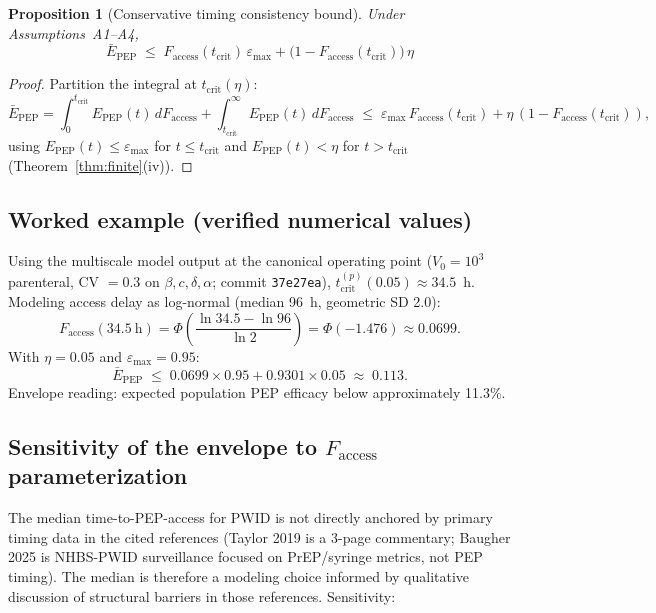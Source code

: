 \documentclass[11pt]{article}
\newtheorem{proposition}{Proposition}[section]
\theoremstyle{definition}
\theoremstyle{remark}
\newcommand{\Epep}{E_{\text{PEP}}}
\newcommand{\Ebarpep}{\bar{E}_{\text{PEP}}}
\newcommand{\Faccess}{F_{\text{access}}}
\newcommand{\tcrit}{t_{\text{crit}}}
\newcommand{\emax}{\varepsilon_{\max}}
\begin{document}
\begin{proposition}[Conservative timing consistency bound]\label{prop:bound}
Under Assumptions~A1--A4,
\begin{equation}
\Ebarpep \;\leq\; \Faccess(\tcrit)\,\emax + \big(1 - \Faccess(\tcrit)\big)\,\eta
\label{eq:bound_si}
\end{equation}
\end{proposition}

\begin{proof}
Partition the integral at $\tcrit(\eta)$:
\[
\Ebarpep = \int_{0}^{\tcrit} \Epep(t)\,d\Faccess + \int_{\tcrit}^{\infty} \Epep(t)\,d\Faccess
\;\leq\; \emax\,\Faccess(\tcrit) + \eta\,(1 - \Faccess(\tcrit)),
\]
using $\Epep(t) \leq \emax$ for $t \leq \tcrit$ and $\Epep(t) < \eta$ for $t > \tcrit$ (Theorem~\ref{thm:finite}(iv)).
\end{proof}

\subsection{Worked example (verified numerical values)}

Using the multiscale model output at the canonical operating point ($V_{0} = 10^{3}$ parenteral, CV $= 0.3$ on $\beta, c, \delta, \alpha$; commit \texttt{37e27ea}), $\tcrit^{(p)}(0.05) \approx 34.5$~h. Modeling access delay as log-normal (median 96~h, geometric SD 2.0):
\[
\Faccess(34.5~\text{h}) = \Phi\!\left(\frac{\ln 34.5 - \ln 96}{\ln 2}\right) = \Phi(-1.476) \approx 0.0699.
\]
With $\eta = 0.05$ and $\emax = 0.95$:
\[
\Ebarpep \;\leq\; 0.0699 \times 0.95 + 0.9301 \times 0.05 \;\approx\; 0.113.
\]
Envelope reading: expected population PEP efficacy below approximately 11.3\%.

\subsection{Sensitivity of the envelope to \texorpdfstring{$\Faccess$}{Faccess} parameterization}

The median time-to-PEP-access for PWID is not directly anchored by primary timing data in the cited references (Taylor 2019\cite{taylor2019_si} is a 3-page commentary; Baugher 2025\cite{baugher2025_si} is NHBS-PWID surveillance focused on PrEP/syringe metrics, not PEP timing). The median is therefore a modeling choice informed by qualitative discussion of structural barriers in those references. Sensitivity:
\end{document}
